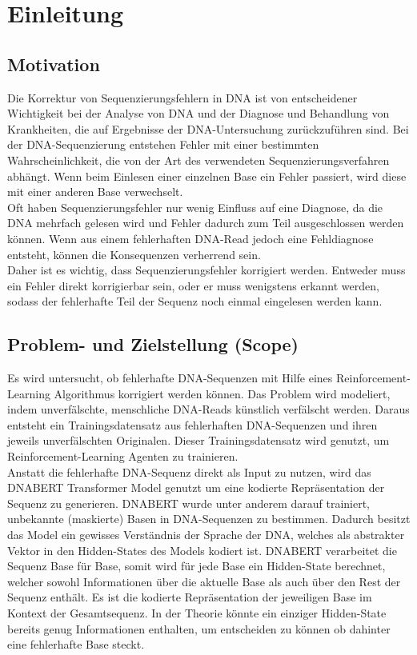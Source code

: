 \documentclass[oneside,bibliography=totocnumbered,BCOR=5mm]{scrbook}%
\theoremstyle{definition}
\theoremstyle{definition}
\theoremstyle{definition}
\theoremstyle{definition}
\theoremstyle{definition}
\theoremstyle{definition}
\begin{document}
\chapter{Einleitung}
\section{Motivation}
Die Korrektur von Sequenzierungsfehlern in DNA ist von entscheidener Wichtigkeit bei der Analyse von DNA
und der Diagnose und Behandlung von Krankheiten, die auf Ergebnisse der DNA-Untersuchung zurückzuführen sind. 
Bei der DNA-Sequenzierung entstehen Fehler mit einer bestimmten Wahrscheinlichkeit, die von der Art des verwendeten Sequenzierungsverfahren abhängt.
Wenn beim Einlesen einer einzelnen Base ein Fehler passiert, wird diese mit einer anderen Base verwechselt.\\


Oft haben Sequenzierungsfehler nur wenig Einfluss auf eine Diagnose, da die DNA mehrfach gelesen wird und Fehler dadurch
zum Teil ausgeschlossen werden können.
Wenn aus einem fehlerhaften DNA-Read jedoch eine Fehldiagnose entsteht, können die Konsequenzen verherrend sein. \\


Daher ist es wichtig, dass Sequenzierungsfehler korrigiert werden. 
Entweder muss ein Fehler direkt korrigierbar sein, oder er muss wenigstens erkannt werden, 
sodass der fehlerhafte Teil der Sequenz noch einmal eingelesen werden kann. 


\section{Problem- und Zielstellung (Scope)}
Es wird untersucht, ob fehlerhafte DNA-Sequenzen mit Hilfe eines Reinforcement-Learning Algorithmus korrigiert werden können. 
Das Problem wird modeliert, indem unverfälschte, menschliche DNA-Reads künstlich verfälscht werden. 
Daraus entsteht ein Trainingsdatensatz aus fehlerhaften DNA-Sequenzen und ihren jeweils unverfälschten Originalen.
Dieser Trainingsdatensatz wird genutzt, um Reinforcement-Learning Agenten zu trainieren.\\


Anstatt die fehlerhafte DNA-Sequenz direkt als Input zu nutzen, wird das DNABERT Transformer Model genutzt um eine 
kodierte Repräsentation der Sequenz zu generieren. 
DNABERT wurde unter anderem darauf trainiert, unbekannte (maskierte) Basen in DNA-Sequenzen zu bestimmen. 
Dadurch besitzt das Model ein gewisses Verständnis der Sprache der DNA, 
welches als abstrakter Vektor in den Hidden-States des Models kodiert ist. 
DNABERT verarbeitet die Sequenz Base für Base, somit wird für jede Base ein Hidden-State berechnet,
welcher sowohl Informationen über die aktuelle Base als auch über den Rest der Sequenz enthält.
Es ist die kodierte Repräsentation der jeweiligen Base im Kontext der Gesamtsequenz.
In der Theorie könnte ein einziger Hidden-State bereits genug Informationen enthalten, 
um entscheiden zu können ob dahinter eine fehlerhafte Base steckt.\\
\end{document}
